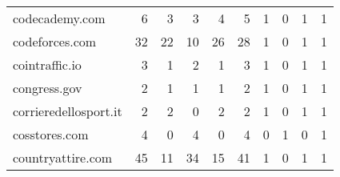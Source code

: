 \begin{tabular}{lrrrrrrrrr}
             codecademy.com &                                6 &                                  3 &                                      3 &                            4 &                           5 &                                   1 &                                      0 &                             1 &                            1 \\
             codeforces.com &                               32 &                                 22 &                                     10 &                           26 &                          28 &                                   1 &                                      0 &                             1 &                            1 \\
             cointraffic.io &                                3 &                                  1 &                                      2 &                            1 &                           3 &                                   1 &                                      0 &                             1 &                            1 \\
               congress.gov &                                2 &                                  1 &                                      1 &                            1 &                           2 &                                   1 &                                      0 &                             1 &                            1 \\
      corrieredellosport.it &                                2 &                                  2 &                                      0 &                            2 &                           2 &                                   1 &                                      0 &                             1 &                            1 \\
              cosstores.com &                                4 &                                  0 &                                      4 &                            0 &                           4 &                                   0 &                                      1 &                             0 &                            1 \\
          countryattire.com &                               45 &                                 11 &                                     34 &                           15 &                          41 &                                   1 &                                      0 &                             1 &                            1 \\

\end{tabular}
